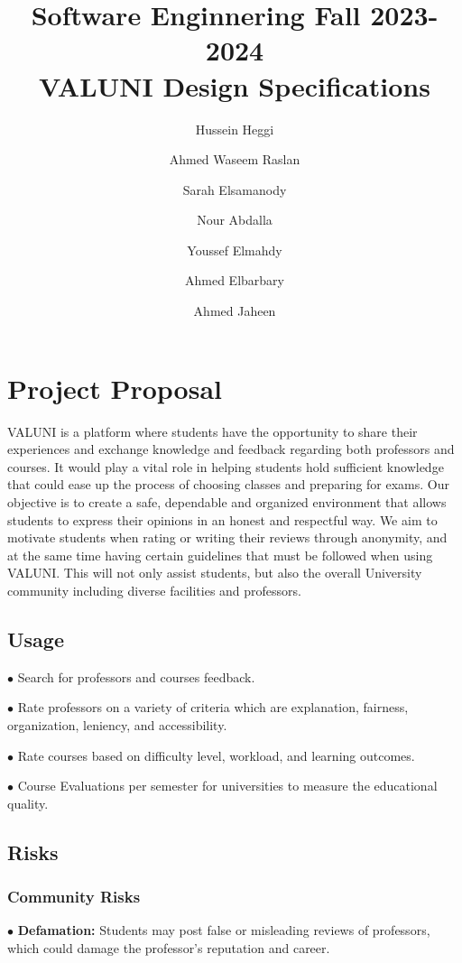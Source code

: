 \documentclass{article}
\title{Software Enginnering Fall 2023-2024 \\ VALUNI Design Specifications}
\author{  
Hussein Heggi 	\and
Ahmed Waseem Raslan 	\and
Sarah Elsamanody 	\and
Nour Abdalla 	\and
Youssef Elmahdy	\and
Ahmed Elbarbary	\and 
Ahmed Jaheen}
\begin{document}
\begin{titlingpage}
\maketitle
\end{titlingpage}

\break

\tableofcontents

\break 


\section{Project Proposal}
\quad VALUNI is a platform where students have the opportunity to share their experiences and exchange knowledge and feedback regarding both professors and courses.  It would play a vital role in helping students hold sufficient knowledge that could ease up the process of choosing classes and preparing for exams. Our objective is to create a safe, dependable and organized environment that allows students to express their opinions in an honest and respectful way. We aim to motivate students when rating or writing their reviews through anonymity, and at the same time having certain guidelines that must be followed when using VALUNI. This will not only assist students, but also the overall University community including diverse facilities and professors. 

\subsection{Usage}
$\bullet$ Search for professors and courses feedback.  

$\bullet$ Rate professors on a variety of criteria which are explanation, fairness, organization, leniency, and accessibility.

$\bullet$ Rate courses based on difficulty level, workload, and learning outcomes.

$\bullet$ Course Evaluations per semester for universities to measure the educational quality.

\subsection{Risks} 

\subsubsection{Community Risks}
$\bullet$ \textbf{Defamation:} Students may post false or misleading reviews of professors, which could damage the professor's reputation and career.
\end{document}
